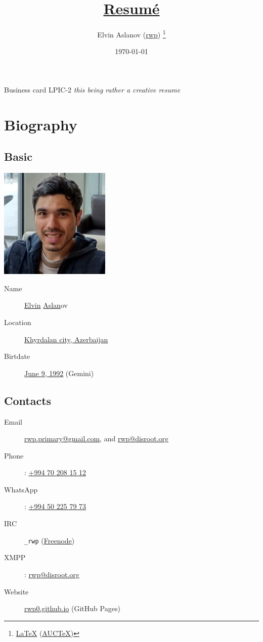 \documentclass {article}
\title {\href{https://github.com/rwp0/resume}{Resumé}}
\author {Elvin Aslanov (\href{https://rwp0.github.io/}{rwp}) \thanks{\href{https://en.wikipedia.org/wiki/LaTeX}{\LaTeX} (\href{https://www.gnu.org/software/auctex/}{AUCTeX})}}
\date {\today}
\begin{document}
  \begin {titlepage}
    \maketitle
  \end {titlepage}
   {Business card}
   {LPIC-2}
  \textit {this being rather a creative resume}

  \section {Biography}

    \subsection {Basic}
    \includegraphics [scale = 0.5] {resume.jpg}
      \begin {description}
      \item [Name] \href{https://en.wiktionary.org/wiki/Elvin}{Elvin} \href{https://en.wiktionary.org/wiki/Aslan}{Aslan}ov
        \item [Location] \href{https://www.openstreetmap.org/way/186275017}{Khyrdalan city, Azerbaijan}
        \item [Birtdate] \href{https://www.timeanddate.com/date/durationresult.html?m1=06&d1=09&y1=1992}{June 9, 1992} (Gemini)
      \end {description}

     \subsection{Contacts}
       \begin{description}
         \item[Email] \href{mailto:rwp.primary@gmail.com}{rwp.primary@gmail.com}, and \href{mailto:rwp@disroot.org}{rwp@disroot.org}
         \item[Phone]: \href{tel:+994702081512}{+994 70 208 15 12}
         \item[WhatsApp]: \href{tel:+994502257973}{+994 50 225 79 73}
         \item[IRC] \verb|_rwp| (\href{https://freenode.net/}{Freenode})
         \item[XMPP]: \url{rwp@disroot.org}
         \item[Website] \href{https://rwp0.github.io/}{rwp0.github.io} (GitHub Pages)
       \end{description}
\end{document}
